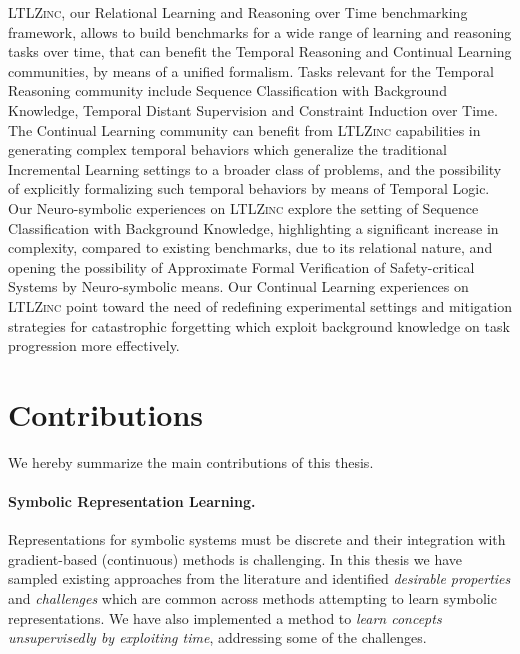 \textsc{LTLZinc}, our Relational Learning and Reasoning over Time benchmarking framework, allows to build benchmarks for a wide range of learning and reasoning tasks over time, that can benefit the Temporal Reasoning and Continual Learning communities, by means of a unified formalism. Tasks relevant for the Temporal Reasoning community include Sequence Classification with Background Knowledge, Temporal Distant Supervision and Constraint Induction over Time. The Continual Learning community can benefit from \textsc{LTLZinc} capabilities in generating complex temporal behaviors which generalize the traditional Incremental Learning settings to a broader class of problems, and the possibility of explicitly formalizing such temporal behaviors by means of Temporal Logic. Our Neuro-symbolic experiences on \textsc{LTLZinc} explore the setting of Sequence Classification with Background Knowledge, highlighting a significant increase in complexity, compared to existing benchmarks, due to its relational nature, and opening the possibility of Approximate Formal Verification of Safety-critical Systems by Neuro-symbolic means.
Our Continual Learning experiences on \textsc{LTLZinc} point toward the need of redefining experimental settings and mitigation strategies for catastrophic forgetting which exploit background knowledge on task progression more effectively.

\section{Contributions}
We hereby summarize the main contributions of this thesis.

\paragraph{Symbolic Representation Learning.} Representations for symbolic systems must be discrete and their integration with gradient-based (continuous) methods is challenging. In this thesis we have sampled existing approaches from the literature and identified \textit{desirable properties} and \textit{challenges} which are common across methods attempting to learn symbolic representations. We have also implemented a method to \textit{learn concepts unsupervisedly by exploiting time}, addressing some of the challenges.

